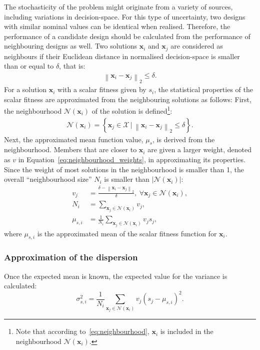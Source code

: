 \documentclass{llncs}
\newcommand{\brr}[1]{{\left({#1}\right)}} %
\newcommand{\brf}[1]{\left\lbrace{#1}\right\rbrace} %
\newcommand{\brabs}[1]{\left\vert{#1}\right\vert} %
\newcommand{\norm}[2]{\left\|{#1}\right\|_{#2}} %
\newcommand{\vx}{\mathbf{x}} %
\newcommand{\NSet}{\mathcal{N}} %
\newcommand{\XSet}{\mathcal{X}} %
\begin{document}
The stochasticity of the problem might originate from a variety of sources, including variations in decision-space. For this type of uncertainty, two designs with similar nominal values can be identical when realised. Therefore, the performance of a candidate design should be calculated from the performance of neighbouring designs as well. Two solutions $\vx_i$ and $\vx_j$ are considered as neighbours if their Euclidean distance in normalised decision-space is smaller than or equal to $\delta$, that is:
\begin{align}
\norm{\vx_i-\vx_j}{2}\leq\delta.
\end{align}
For a solution $\vx_i$ with a scalar fitness given by $s_i$, the statistical properties of the scalar fitness are approximated from the neighbouring solutions as follows:
First, the neighbourhood $\NSet(\vx_i)$ of the solution is defined\footnote{Note that according to~\eqref{eq:neighbourhood}, $\vx_i$ is included in the neighbourhood $\NSet(\vx_i)$.}:
\begin{align}
\NSet(\vx_i)=\brf{\vx_j\in \XSet \,\vert \,\norm{\vx_i-\vx_j}{2}\leq\delta}.
\label{eq:neighbourhood}
\end{align}
Next, the approximated mean function value, $\mu_s$, is derived from the neighbourhood.
Members that are closer to $\vx_i$ are given a larger weight, denoted as $v$ in Equation~\eqref{eq:neighbourhood_weights}, in approximating its properties.
Since the weight of most solutions in the neighbourhood is smaller than 1, the overall ``neighbourhood size'' $N_i$ is smaller than $\brabs{\NSet(\vx_i)}$:
\begin{align}
\label{eq:neighbourhood_weights}
v_j &= \frac{\delta-\norm{\vx_i-\vx_j}{2}}{\delta}, ~\forall \vx_j\in\NSet(\vx_i),\\
\label{eq:neighbourhood_size}
N_i &= \sum_{\vx_j\in\NSet(\vx_i)} v_j,\\
\label{eq:neighbourhood_mean}
\mu_{s,i} &= \frac{1}{N_i}  \sum_{\vx_j\in\NSet(\vx_i)} v_j s_j,
\end{align}
where $\mu_{s,i}$ is the approximated mean of the scalar fitness function for $\vx_i$.

\subsubsection{Approximation of the dispersion}

Once the expected mean is known, the expected value for the variance is calculated:
\begin{equation}
\sigma_{s,i}^2 = \frac{1}{N_i} \sum_{\vx_j\in\NSet(\vx_i)} v_j \brr{s_j - \mu_{s,i}}^2 .
\label{eq:neighbourhood_variance}
\end{equation}
\end{document}

